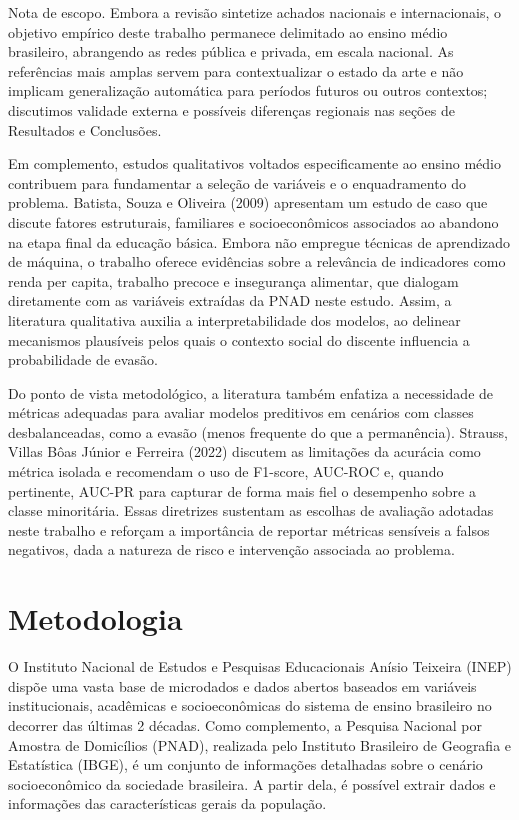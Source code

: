 \documentclass[english, spanish, brazilian]{RBIEarticle} %
\begin{document}
Nota de escopo. Embora a revisão sintetize achados nacionais e internacionais, o objetivo empírico
deste trabalho permanece delimitado ao ensino médio brasileiro, abrangendo as redes pública e
privada, em escala nacional. As referências mais amplas servem para contextualizar o estado da
arte e não implicam generalização automática para períodos futuros ou outros contextos;
discutimos validade externa e possíveis diferenças regionais nas seções de Resultados e
Conclusões.

Em complemento, estudos qualitativos voltados especificamente ao ensino médio contribuem para
fundamentar a seleção de variáveis e o enquadramento do problema. Batista, Souza e Oliveira
(2009) apresentam um estudo de caso que discute fatores estruturais, familiares e socioeconômicos
associados ao abandono na etapa final da educação básica. Embora não empregue técnicas de
aprendizado de máquina, o trabalho oferece evidências sobre a relevância de indicadores como
renda per capita, trabalho precoce e insegurança alimentar, que dialogam diretamente com as
variáveis extraídas da PNAD neste estudo. Assim, a literatura qualitativa auxilia a interpretabilidade
dos modelos, ao delinear mecanismos plausíveis pelos quais o contexto social do discente
influencia a probabilidade de evasão.

Do ponto de vista metodológico, a literatura também enfatiza a necessidade de métricas adequadas
para avaliar modelos preditivos em cenários com classes desbalanceadas, como a evasão (menos
frequente do que a permanência). Strauss, Villas Bôas Júnior e Ferreira (2022) discutem as
limitações da acurácia como métrica isolada e recomendam o uso de F1-score, AUC-ROC e, quando
pertinente, AUC-PR para capturar de forma mais fiel o desempenho sobre a classe minoritária.
Essas diretrizes sustentam as escolhas de avaliação adotadas neste trabalho e reforçam a importância
de reportar métricas sensíveis a falsos negativos, dada a natureza de risco e intervenção associada ao
problema.



\section{Metodologia}
O Instituto Nacional de Estudos e Pesquisas Educacionais Anísio Teixeira (INEP) dispõe uma vasta base de microdados e dados abertos baseados em variáveis institucionais, acadêmicas e socioeconômicas do sistema de ensino brasileiro no decorrer das últimas 2 décadas. Como complemento, a Pesquisa Nacional por Amostra de Domicílios (PNAD), realizada pelo Instituto Brasileiro de Geografia e Estatística (IBGE), é um conjunto de informações detalhadas sobre o cenário socioeconômico da sociedade brasileira. A partir dela, é possível extrair dados e informações das características gerais da população.  
\end{document}
